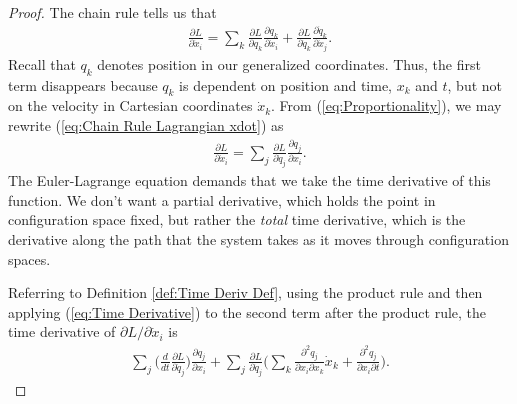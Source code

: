 \documentclass[10pt, psamsfonts]{amsart}
\theoremstyle{definition}
\theoremstyle{remark}
\numberwithin{equation}{section}
\begin{document}
\begin{proof}
The chain rule tells us that
\begin{align}
  \label{eq:Chain Rule Lagrangian xdot} 
  \frac{\partial L}{\partial \dot{x}_i}  = \sum_k \frac{\partial L}{\partial q_k} \frac{\partial q_k}{\partial \dot{x}_i} + \frac{\partial L}{\partial \dot{q}_k} \frac{\partial \dot{q}_k}{\partial \dot{x}_j}.
\end{align}
Recall that $q_k$ denotes position in our generalized coordinates. Thus, the first term disappears because $q_k$ is dependent on position and time, $x_k$ and $t$, but not on the velocity in Cartesian coordinates $\dot{x}_k$. From (\ref{eq:Proportionality}), we may rewrite (\ref{eq:Chain Rule Lagrangian xdot}) as
\begin{align*}
  \frac{\partial L}{\partial \dot{x}_i} = \sum_j \frac{\partial L}{\partial \dot{q}_j} \frac{\partial q_j}{\partial x_i}. 
\end{align*}
The Euler-Lagrange equation demands that we take the time derivative of this function. We don't want a partial derivative, which holds the point in configuration space fixed, but rather the \textit{total} time derivative, which is the derivative along the path that the system takes as it moves through configuration spaces.

\noindent Referring to Definition \ref{def:Time Deriv Def}, using the product rule and then applying (\ref{eq:Time Derivative}) to the second term after the product rule, the time derivative of $\partial L/\partial \dot{x}_i$ is
\begin{align}
  \label{eq:Time Derivative Lagrangian}
  \sum_j \bigg(\frac{d}{dt} \frac{\partial L}{\partial \dot{q}_j}  \bigg) \frac{\partial q_j}{\partial x_i} + \sum_j \frac{\partial L}{\partial \dot{q}_j} \bigg(\sum_{k} \frac{\partial^2 q_j}{\partial x_i \partial x_k} \dot{x}_k + \frac{\partial^2 q_j}{\partial x_i \partial t}  \bigg).
\end{align}


\end{proof}
\end{document}
